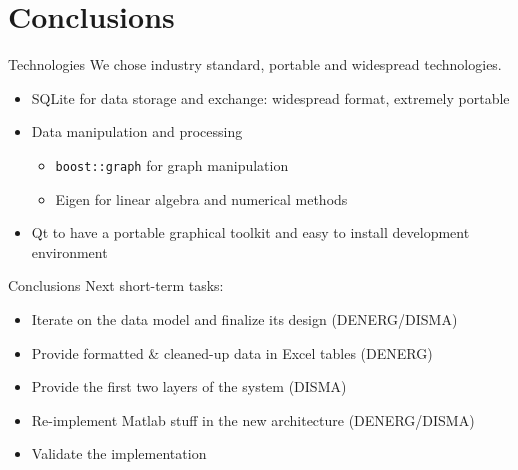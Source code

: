 \documentclass[10pt,aspectratio=169]{beamer}
\begin{document}
\section{Conclusions}

\begin{frame}{Technologies}
    We chose industry standard, portable and widespread technologies.
    \begin{itemize}
        \item SQLite for data storage and exchange: widespread format, extremely portable
        \item Data manipulation and processing
        \begin{itemize}
            \item \texttt{boost::graph} for graph manipulation
            \item Eigen for linear algebra and numerical methods
        \end{itemize}
        \item Qt to have a portable graphical toolkit and easy to install development environment
    \end{itemize}
\end{frame}

\begin{frame}{Conclusions}
    Next short-term tasks:
    \begin{itemize}
        \item Iterate on the data model and finalize its design (DENERG/DISMA)
        \item Provide formatted \& cleaned-up data in Excel tables (DENERG)
        \item Provide the first two layers of the system (DISMA)
        \item Re-implement Matlab stuff in the new architecture (DENERG/DISMA)
        \item Validate the implementation
    \end{itemize}
\end{frame}
\end{document}
